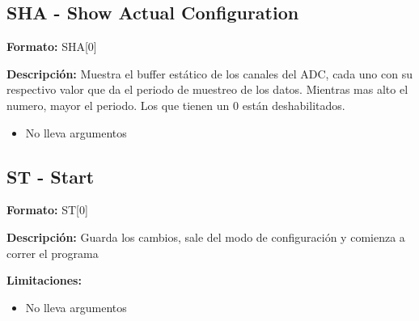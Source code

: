 \subsection{SHA - Show Actual Configuration} %
\label{sub:sha_show_actual_configuration}
\textbf{Formato:} SHA[0]

\textbf{Descripci\'on:}
Muestra el buffer est\'atico de los canales del ADC, cada uno con su respectivo valor que da el periodo de muestreo de los datos. Mientras mas alto el numero, mayor el periodo. Los que tienen un 0 est\'an deshabilitados.

\begin{itemize}
  \item No lleva argumentos
\end{itemize}


\subsection{ST - Start} %
\label{sub:st_start}


\textbf{Formato:} ST[0]

\textbf{Descripci\'on:}
Guarda los cambios, sale del modo de configuraci\'on y comienza a correr el programa

\textbf{Limitaciones:}
\begin{itemize}
  \item No lleva argumentos
\end{itemize}

